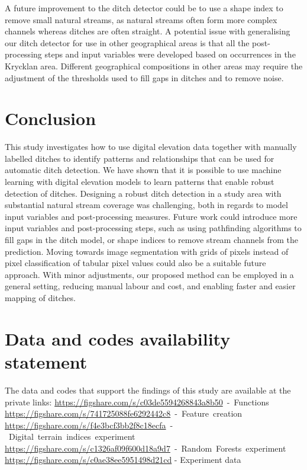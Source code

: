 \documentclass[]{interact}
\theoremstyle{plain}%
\theoremstyle{definition}
\theoremstyle{remark}
\begin{document}
A future improvement to the ditch detector could be to use a shape index to remove small natural streams, as natural streams often form more complex channels whereas ditches are often straight. A potential issue with generalising our ditch detector for use in other geographical areas is that all the post-processing steps and input variables were developed based on occurrences in the Krycklan area. Different geographical compositions in other areas may require the adjustment of the thresholds used to fill gaps in ditches and to remove noise.

\section{Conclusion}

This study investigates how to use digital elevation data together with manually labelled ditches to identify patterns and relationships that can be used for automatic ditch detection. We have shown that it is possible to use machine learning with digital elevation models to learn patterns that enable robust detection of ditches. Designing a robust ditch detection in a study area with substantial natural stream coverage was challenging, both in regards to model input variables and post-processing measures. Future work could introduce more input variables and post-processing steps, such as using pathfinding algorithms to fill gaps in the ditch model, or shape indices to remove stream channels from the prediction. Moving towards image segmentation with grids of pixels instead of pixel classification of tabular pixel values could also be a suitable future approach. With minor adjustments, our proposed method can be employed in a general setting, reducing manual labour and cost, and enabling faster and easier mapping of ditches.

\section*{Data and codes availability statement}
The data and codes that support the findings of this study are available at the private links:\newline
\mbox{\href{https://figshare.com/s/c03de5594268843a8b50}{https://figshare.com/s/c03de5594268843a8b50} - Functions\itshape\ignorespaces}
\mbox{\href{https://figshare.com/s/741725088fe6292442c8}{https://figshare.com/s/741725088fe6292442c8} - Feature creation\itshape\ignorespaces}
\mbox{\href{https://figshare.com/s/f4e3bcf3bb2f8c18ecfa}{https://figshare.com/s/f4e3bcf3bb2f8c18ecfa} - Digital terrain indices experiment\itshape\ignorespaces}
\mbox{\href{https://figshare.com/s/c1326af09f600d18a9d7}{https://figshare.com/s/c1326af09f600d18a9d7} - Random Forests experiment\itshape\ignorespaces}
\mbox{\href{https://figshare.com/s/c0ae38ee5951498d21cd}{https://figshare.com/s/c0ae38ee5951498d21cd}} - Experiment data
\end{document}
